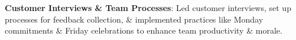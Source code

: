 \documentclass[letterpaper,11pt]{article}
\newcommand{\resumeItem}[2]{
  \item\small{
    \textbf{#1}{: #2 \vspace{-2pt}}
  }
}
\begin{document}
            \resumeItem{Customer Interviews \& Team Processes}
            {Led customer interviews, set up processes for feedback collection, \& implemented practices like Monday commitments \& Friday celebrations to enhance team productivity \& morale.}
            
          
\end{document}

